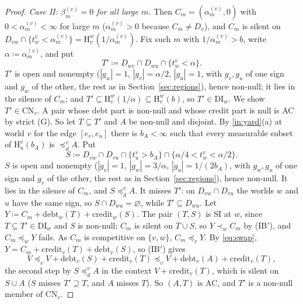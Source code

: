 \documentclass[11pt]{article}
\theoremstyle{definition}\newtheorem{definition}[theorem]{Definition}
\theoremstyle{remark}\newtheorem{remark}[theorem]{Remark}
\newcommand{\debt}{\mathrm{debt}}
\newcommand{\cred}{\mathrm{credit}}
\newcommand{\Hi}[3]{\mathrm H^{#1}_{#2}(#3)}
\newcommand{\CN}{\mathrm{CN}}
\newcommand{\DI}{\mathrm{DI}}
\begin{document}
\begin{proof}
\emph{Case II: $\beta^{(v)}_m=0$ for all large $m$.} Then
$C_m=(\alpha^{(v)}_m,0)$ with $0<\alpha^{(v)}_m<\infty$ for large $m$
($\alpha^{(v)}_m>0$ because $C_m\ne D_v$), and $C_m$ is silent on
$D_{vw}\cap\{t^v_w<\alpha^{(v)}_m\}=\Hi wv{1/\alpha^{(v)}_m}$. Fix such $m$
with $1/\alpha^{(v)}_m>b$, write $\alpha\coloneqq\alpha^{(v)}_m$, and put
\[
 T'\coloneqq D_{wv}\cap D_{wu}\cap\{t^v_w<\alpha\}.
\]
$T'$ is open and nonempty ($|g_w|=1$, $|g_v|=\alpha/2$, $|g_u|=1$, with
$g_v,g_u$ of one sign and $g_w$ of the other, the rest as in
Section~\ref{sec:regions}), hence non-null; it lies in
the silence of $C_m$; and $T'\subseteq\Hi wv{1/\alpha}\subseteq\Hi wvb$, so
$T'\in\DI_w$. We show $T'\in\CN_v$. A pair whose debt part is non-null and
whose credit part is null is AC by strict (G). So let $T\subseteq T'$ and
$A$ be non-null and disjoint. By \ref{in:yard}(a) at world $v$ for the edge
$[e_v,e_u]$ there is $b_A<\infty$ such that every measurable subset of $\Hi
vu{b_A}$ is $\preceq^v_dA$. Put
\[
 S\coloneqq D_{vw}\cap D_{vu}\cap\{t^v_u>b_A\}\cap
 \{\alpha/4<t^v_w<\alpha/2\}.
\]
$S$ is open and nonempty ($|g_v|=1$, $|g_w|=3/\alpha$, $|g_u|=1/(2b_A)$,
with $g_w,g_u$ of one sign and $g_v$ of the other, the rest as in
Section~\ref{sec:regions}), hence non-null. It lies
in the silence of $C_m$, and $S\preceq^v_dA$. It misses $T'$: on
$D_{vw}\cap D_{vu}$ the worlds $w$ and $u$ have the same sign, so $S\cap
D_{wu}=\varnothing$, while $T'\subseteq D_{wu}$. Let
$Y\coloneqq C_m+\debt_w(T)+\cred_w(S)$. The pair $(T,S)$ is SI at $w$,
since $T\subseteq T'\in\DI_w$ and $S$ is non-null; $C_m$ is silent on
$T\cup S$, so $Y\prec_wC_m$ by (IB$'$), and $C_m\preceq_wY$ fails. As
$C_m$ is competitive on $\{v,w\}$, $C_m\preceq_vY$. By \eqref{eq:swap},
$Y=C_m+\cred_v(T)+\debt_v(S)$, so (IB$'$) gives
\[
 V\preceq_vV+\debt_v(S)+\cred_v(T)\preceq_vV+\debt_v(A)+\cred_v(T),
\]
the second step by $S\preceq^v_dA$ in the context $V+\cred_v(T)$, which is
silent on $S\cup A$ ($S$ misses $T'\supseteq T$, and $A$ misses $T$). So
$(A,T)$ is AC, and $T'$ is a non-null member of $\CN_v$.
\end{proof}
\end{document}
